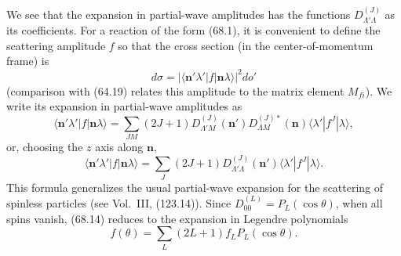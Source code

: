 We see that the expansion in partial-wave amplitudes has the functions $D_{\Lambda'\Lambda}^{(J)}$ as its coefficients. For a reaction of the form (68.1), it is convenient to define the scattering amplitude $f$ so that the cross section (in the center-of-momentum frame) is
\begin{equation}
d\sigma=|\langle\mathbf n'\lambda'|f|\mathbf n\lambda\rangle|^2do'
\tag{68.12}
\end{equation}
(comparison with (64.19) relates this amplitude to the matrix element $M_{fi}$). We write its expansion in partial-wave amplitudes as
\begin{equation}
\langle\mathbf n'\lambda'|f|\mathbf n\lambda\rangle
=\sum_{JM}(2J+1)D_{\Lambda'M}^{(J)}(\mathbf n')
D_{\Lambda M}^{(J)*}(\mathbf n)
\langle\lambda'|f^J|\lambda\rangle,
\tag{68.13}
\end{equation}
or, choosing the $z$ axis along $\mathbf n$,
\begin{equation}
\langle\mathbf n'\lambda'|f|\mathbf n\lambda\rangle
=\sum_J(2J+1)D_{\Lambda'\Lambda}^{(J)}(\mathbf n')
\langle\lambda'|f^J|\lambda\rangle.
\tag{68.14}
\end{equation}
This formula generalizes the usual partial-wave expansion for the scattering of spinless particles (see Vol.~III, (123.14)). Since $D_{00}^{(L)}=P_L(\cos\theta)$, when all spins vanish, (68.14) reduces to the expansion in Legendre polynomials
\[
f(\theta)=\sum_L(2L+1)f_LP_L(\cos\theta).
\]

